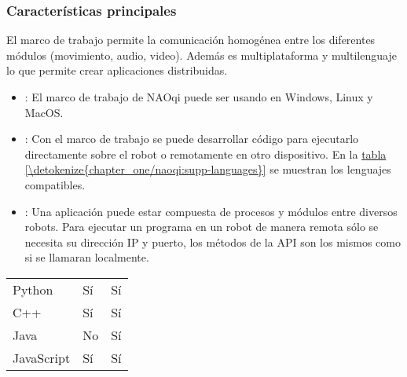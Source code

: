 \subsubsection{Características principales}
\label{\detokenize{chapter_one/naoqi:caracteristicas-principales}}
El marco de trabajo permite la comunicación homogénea entre los diferentes
módulos (movimiento, audio, video). Además es multiplataforma y multilenguaje
lo que permite crear aplicaciones distribuidas.
\begin{itemize}
\item {} 
: El marco de trabajo de NAOqi puede ser usando en Windows, Linux y MacOS.

\item {} 
: Con el marco de trabajo se puede desarrollar código para ejecutarlo directamente sobre el robot o remotamente en otro dispositivo. En la \hyperref[\detokenize{chapter_one/naoqi:supp-languages}]{tabla \ref{\detokenize{chapter_one/naoqi:supp-languages}}} se muestran los lenguajes compatibles.

\item {} 
: Una aplicación puede estar compuesta de procesos y módulos entre diversos robots. Para ejecutar un programa en un robot de manera remota sólo se necesita su dirección IP y puerto, los métodos de la API son los mismos como si se llamaran localmente.

\end{itemize}


\begin{savenotes}\sphinxattablestart
\centering
{}
\label{\detokenize{chapter_one/naoqi:supp-languages}}
\sphinxaftercaption
\begin{tabulary}{\linewidth}[t]{|T|T|T|}
\hline
{}\relax &\relax &\relax \\
\hline
Python
&
Sí
&
Sí
\\
\hline
C++
&
Sí
&
Sí
\\
\hline
Java
&
No
&
Sí
\\
\hline
JavaScript
&
Sí
&
Sí
\\
\hline
\end{tabulary}
\par
\sphinxattableend\end{savenotes}


